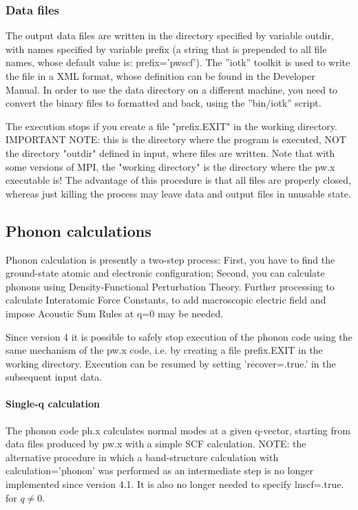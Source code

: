 \documentclass[12pt,a4paper]{article}
\begin{document}
\subsubsection{Data files}

The output data files are written in the directory specified by variable
outdir, with names specified by variable prefix (a string that is prepended
to all file names, whose default value is: prefix='pwscf'). The ''iotk''
toolkit is used to write the file in a XML format, whose definition can
be found in the Developer Manual. In order to use the data directory
on a different machine, you need to convert the binary files to formatted
and back, using the ''bin/iotk'' script.

The execution stops if you create a file "prefix.EXIT" in the working 
directory. IMPORTANT NOTE: this is the directory where the program 
is executed, NOT the directory "outdir" defined in input, where files 
are written. Note that with some versions of MPI, the "working directory" 
is the directory where the pw.x executable is! The advantage of this 
procedure is that all files are properly closed, whereas  just killing 
the process may leave data and output files in unusable state.

\subsection{Phonon calculations}

Phonon calculation is presently a two-step process:
First, you have to find the ground-state atomic and electronic configuration;
Second, you can calculate phonons using Density-Functional Perturbation Theory.
Further processing to calculate Interatomic Force Constants, to add macroscopic
electric field and impose Acoustic Sum Rules at q=0 may be needed.

Since version 4 it is possible to safely stop execution of the phonon code using
the same mechanism of the pw.x code, i.e. by creating a file prefix.EXIT in the 
working directory. Execution can be resumed by setting 'recover=.true.' in the
subsequent input data.

\paragraph{Single-q calculation}

The phonon code ph.x calculates normal modes at a given q-vector, starting
from data files produced by pw.x with a simple SCF calculation.
NOTE: the alternative procedure in which a band-structure calculation 
with calculation='phonon' was performed as an intermediate step is no
longer implemented since version 4.1. It is also no longer needed to
specify lnscf=.true. for $q\ne 0$.
\end{document}
